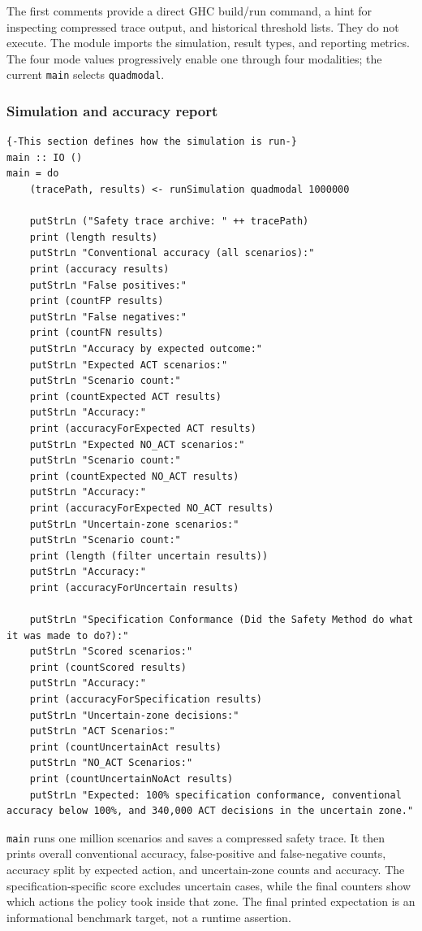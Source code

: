 \documentclass[11pt]{article}
\begin{document}
The first comments provide a direct GHC build/run command, a hint for
inspecting compressed trace output, and historical threshold lists. They do
not execute. The module imports the simulation, result types, and reporting
metrics. The four mode values progressively enable one through four
modalities; the current \texttt{main} selects \texttt{quadmodal}.

\subsubsection{Simulation and accuracy report}

\begin{lstlisting}
{-This section defines how the simulation is run-}
main :: IO ()
main = do
    (tracePath, results) <- runSimulation quadmodal 1000000

    putStrLn ("Safety trace archive: " ++ tracePath)
    print (length results)
    putStrLn "Conventional accuracy (all scenarios):"
    print (accuracy results)
    putStrLn "False positives:"
    print (countFP results)
    putStrLn "False negatives:"
    print (countFN results)
    putStrLn "Accuracy by expected outcome:"
    putStrLn "Expected ACT scenarios:"
    putStrLn "Scenario count:"
    print (countExpected ACT results)
    putStrLn "Accuracy:"
    print (accuracyForExpected ACT results)
    putStrLn "Expected NO_ACT scenarios:"
    putStrLn "Scenario count:"
    print (countExpected NO_ACT results)
    putStrLn "Accuracy:"
    print (accuracyForExpected NO_ACT results)
    putStrLn "Uncertain-zone scenarios:"
    putStrLn "Scenario count:"
    print (length (filter uncertain results))
    putStrLn "Accuracy:"
    print (accuracyForUncertain results)

    putStrLn "Specification Conformance (Did the Safety Method do what it was made to do?):"
    putStrLn "Scored scenarios:"
    print (countScored results)
    putStrLn "Accuracy:"
    print (accuracyForSpecification results)
    putStrLn "Uncertain-zone decisions:"
    putStrLn "ACT Scenarios:"
    print (countUncertainAct results)
    putStrLn "NO_ACT Scenarios:"
    print (countUncertainNoAct results)
    putStrLn "Expected: 100% specification conformance, conventional accuracy below 100%, and 340,000 ACT decisions in the uncertain zone."
\end{lstlisting}

\texttt{main} runs one million scenarios and saves a compressed safety trace.
It then prints overall conventional accuracy, false-positive and
false-negative counts, accuracy split by expected action, and uncertain-zone
counts and accuracy. The specification-specific score excludes uncertain
cases, while the final counters show which actions the policy took inside
that zone. The final printed expectation is an informational benchmark target,
not a runtime assertion.
\end{document}

